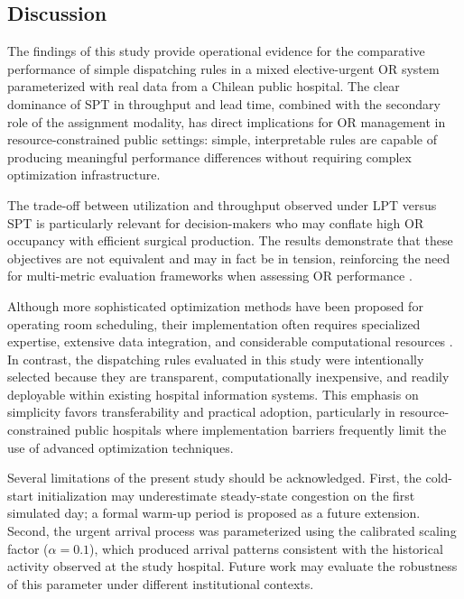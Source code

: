 \documentclass[sn-mathphys-num]{sn-jnl}
\begin{document}

    \subsection{Discussion}\label{sec:discussion}
    
    The findings of this study provide operational evidence for the comparative performance of simple dispatching rules in a mixed elective-urgent OR system parameterized with real data from a Chilean public hospital. The clear dominance of SPT in throughput and lead time, combined with the secondary role of the assignment modality, has direct implications for OR management in resource-constrained public settings: simple, interpretable rules are capable of producing meaningful performance differences without requiring complex optimization infrastructure.

    The trade-off between utilization and throughput observed under LPT versus SPT is particularly relevant for decision-makers who may conflate high OR occupancy with efficient surgical production. The results demonstrate that these objectives are not equivalent and may in fact be in tension, reinforcing the need for multi-metric evaluation frameworks when assessing OR performance \cite{schouten2023}.
    
    Although more sophisticated optimization methods have been proposed for operating room scheduling, their implementation often requires specialized expertise, extensive data integration, and considerable computational resources \cite{al-amin2024,chamarthi2025,zhao2025optimizing}. In contrast, the dispatching rules evaluated in this study were intentionally selected because they are transparent, computationally inexpensive, and readily deployable within existing hospital information systems. This emphasis on simplicity favors transferability and practical adoption, particularly in resource-constrained public hospitals where implementation barriers frequently limit the use of advanced optimization techniques.
    
    Several limitations of the present study should be acknowledged. First, the cold-start initialization may underestimate steady-state congestion on the first simulated day; a formal warm-up period is proposed as a future extension. Second, the urgent arrival process was parameterized using the calibrated scaling factor ($\alpha = 0.1$), which produced arrival patterns consistent with the historical activity observed at the study hospital. Future work may evaluate the robustness of this parameter under different institutional contexts.
    
\end{document}
